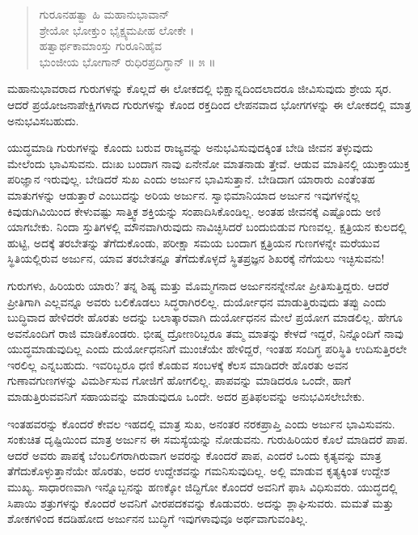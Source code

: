 \begin{verse}
ಗುರೂನಹತ್ವಾ ಹಿ ಮಹಾನುಭಾವಾನ್​\\ಶ್ರೇಯೋ ಭೋಕ್ತುಂ ಭೈಕ್ಷ್ಯಮಪೀಹ ಲೋಕೇ ।\\ಹತ್ವಾರ್ಥಕಾಮಾಂಸ್ತು ಗುರೂನಿಹೈವ\\ಭುಂಜೀಯ ಭೋಗಾನ್ ರುಧಿರಪ್ರದಿಗ್ಧಾನ್ \num{॥ ೫ ॥}
\end{verse}

{\small ಮಹಾನುಭಾವರಾದ ಗುರುಗಳನ್ನು ಕೊಲ್ಲದೆ ಈ ಲೋಕದಲ್ಲಿ ಭಿಕ್ಷಾನ್ನದಿಂದಲಾದರೂ ಜೀವಿಸುವುದು ಶ್ರೇಯ ಸ್ಕರ. ಆದರೆ ಪ್ರಯೋಜನಾಪೇಕ್ಷಿಗಳಾದ ಗುರುಗಳನ್ನು ಕೊಂದ ರಕ್ತದಿಂದ ಲೇಪನವಾದ ಭೋಗಗಳನ್ನು ಈ ಲೋಕದಲ್ಲಿ ಮಾತ್ರ ಅನುಭವಿಸಬಹುದು.}

ಯುದ್ಧಮಾಡಿ ಗುರುಗಳನ್ನು ಕೊಂದು ಬರುವ ರಾಜ್ಯವನ್ನು ಅನುಭವಿಸುವುದಕ್ಕಿಂತ ಬೇಡಿ ಜೀವನ ತಳ್ಳುವುದು ಮೇಲೆಂದು ಭಾವಿಸುವನು. ದುಃಖ ಬಂದಾಗ ನಾವು ಏನೇನೋ ಮಾತನಾಡು ತ್ತೇವೆ. ಆಡುವ ಮಾತಿನಲ್ಲಿ ಯುಕ್ತಾಯುಕ್ತ ಪರಿಜ್ಞಾನ ಇರುವುಲ್ಲ. ಬೇಡಿದರೆ ಸುಖ ಎಂದು ಅರ್ಜುನ ಭಾವಿಸುತ್ತಾನೆ. ಬೇಡಿದಾಗ ಯಾರಾರು ಎಂತೆಂತಹ ಮಾತುಗಳನ್ನು ಆಡುತ್ತಾರೆ ಎಂಬುದನ್ನು ಅರಿಯ ಅರ್ಜುನ. ಸ್ವಾಭಿಮಾನಿಯಾದ ಅರ್ಜುನ ಇವುಗಳನ್ನೆಲ್ಲ ಕಿವುಡುಗಿವಿಯಿಂದ ಕೇಳುವಷ್ಟು ಸಾತ್ತ್ವಿಕ ಶಕ್ತಿಯನ್ನು ಸಂಪಾದಿಸಿಕೊಂಡಿಲ್ಲ. ಅಂತಹ ಜೀವನಕ್ಕೆ ಎಷ್ಟೊಂದು ಅಣಿ ಯಾಗಬೇಕು. ನಿಂದಾ ಸ್ತುತಿಗಳಲ್ಲಿ ಮೌನವಾಗಿರುವುದು ನಾವಿಚ್ಛಿಸಿದರೆ ಬಂದುಬಿಡುವ ಗುಣವಲ್ಲ. ಕ್ಷತ್ರಿಯನ ಕುಲದಲ್ಲಿ ಹುಟ್ಟಿ, ಅದಕ್ಕೆ ತರಬೇತನ್ನು ತೆಗೆದುಕೊಂಡು, ಪರೀಕ್ಷಾ ಸಮಯ ಬಂದಾಗ ಕ್ಷತ್ರಿಯನ ಗುಣಗಳನ್ನೇ ಮರೆಯುವ ಸ್ಥಿತಿಯಲ್ಲಿರುವ ಅರ್ಜುನ, ಯಾವ ತರಬೇತನ್ನೂ ತೆಗೆದುಕೊಳ್ಳದೆ ಸ್ಥಿತಪ್ರಜ್ಞನ ಶಿಖರಕ್ಕೆ ನೆಗೆಯಲು ಇಚ್ಛಿಸುವನು!

ಗುರುಗಳು, ಹಿರಿಯರು ಯಾರು? ತನ್ನ ಶಿಷ್ಯ ಮತ್ತು ಮೊಮ್ಮಗನಾದ ಅರ್ಜುನನನ್ನೇನೋ ಪ್ರೀತಿಸುತ್ತಿದ್ದರು. ಆದರೆ ಪ್ರೀತಿಗಾಗಿ ಎಲ್ಲವನ್ನೂ ಅವರು ಬಲಿಕೊಡಲು ಸಿದ್ಧರಾಗಿರಲಿಲ್ಲ. ದುರ್ಯೋಧನ ಮಾಡುತ್ತಿರುವುದು ತಪ್ಪು ಎಂದು ಬುದ್ಧಿವಾದ ಹೇಳಿದರೇ ಹೊರತು ಅದನ್ನು ಬಲಾತ್ಕಾರವಾಗಿ ದುರ್ಯೋಧನನ ಮೇಲೆ ಪ್ರಯೋಗ ಮಾಡಲಿಲ್ಲ. ಹೇಗೂ ಅವನೊಂದಿಗೆ ರಾಜಿ ಮಾಡಿಕೊಂಡರು. ಭೀಷ್ಮ ದ್ರೋಣರಿಬ್ಬರೂ ತಮ್ಮ ಮಾತನ್ನು ಕೇಳದೆ ಇದ್ದರೆ, ನಿನ್ನೊಂದಿಗೆ ನಾವು ಯುದ್ಧಮಾಡುವುದಿಲ್ಲ ಎಂದು ದುರ್ಯೋಧನನಿಗೆ ಮುಂಚೆಯೇ ಹೇಳಿದ್ದರೆ, ಇಂತಹ ಸಂದಿಗ್ಧ ಪರಿಸ್ಥಿತಿ ಉದಿಸುತ್ತಿರಲೇ ಇರಲಿಲ್ಲ ಎನ್ನಬಹುದು. ಇವರಿಬ್ಬರೂ ಧಣಿ ಕೊಡುವ ಸಂಬಳಕ್ಕೆ ಕೆಲಸ ಮಾಡಿದರೇ ಹೊರತು ಅವನ ಗುಣಾವಗುಣಗಳನ್ನು ವಿಮರ್ಶಿಸುವ ಗೋಜಿಗೆ ಹೋಗಲಿಲ್ಲ. ಪಾಪವನ್ನು ಮಾಡಿದರೂ ಒಂದೇ, ಹಾಗೆ ಮಾಡುತ್ತಿರುವವನಿಗೆ ಸಹಾಯವನ್ನು ಮಾಡುವುದೂ ಒಂದೇ. ಅದರ ಪ್ರತಿಫಲವನ್ನು ಅನುಭವಿಸಲೇಬೇಕು.

ಇಂತಹವರನ್ನು ಕೊಂದರೆ ಕೇವಲ ಇಹದಲ್ಲಿ ಮಾತ್ರ ಸುಖ, ಅನಂತರ ನರಕಪ್ರಾಪ್ತಿ ಎಂದು ಅರ್ಜುನ ಭಾವಿಸುವನು. ಸಂಕುಚಿತ ದೃಷ್ಟಿಯಿಂದ ಮಾತ್ರ ಅರ್ಜುನ ಈ ಸಮಸ್ಯೆಯನ್ನು ನೋಡುವನು. ಗುರುಹಿರಿಯರ ಕೊಲೆ ಮಾಡಿದರೆ ಪಾಪ. ಆದರೆ ಅವರು ಪಾಪಕ್ಕೆ ಬೆಂಬಲಿಗರಾಗಿರುವಾಗ ಅವರನ್ನು ಕೊಂದರೆ ಪಾಪ, ಎಂದರೆ ಒಂದು ಕೃತ್ಯವನ್ನು ಮಾತ್ರ ತೆಗೆದುಕೊಳ್ಳುತ್ತಾನೆಯೇ ಹೊರತು, ಅದರ ಉದ್ದೇಶವನ್ನು ಗಮನಿಸುವುದಿಲ್ಲ. ಅಲ್ಲಿ ಮಾಡುವ ಕೃತ್ಯಕ್ಕಿಂತ ಉದ್ದೇಶ ಮುಖ್ಯ. ಸಾಧಾರಣವಾಗಿ ಇನ್ನೊಬ್ಬನನ್ನು ಹಣಕ್ಕೋ ಜಿದ್ದಿಗೋ ಕೊಂದರೆ ಅವನಿಗೆ ಫಾಸಿ ವಿಧಿಸುವರು. ಯುದ್ಧದಲ್ಲಿ ಸಿಪಾಯಿ ಶತ್ರುಗಳನ್ನು ಕೊಂದರೆ ಅವನಿಗೆ ವೀರಪದಕವನ್ನು ಕೊಡುವರು. ಅದನ್ನು ಶ್ಲಾಘಿಸುವರು. ಮಮತೆ ಮತ್ತು ಶೋಕಗಳಿಂದ ಕದಡಿಹೋದ ಅರ್ಜುನನ ಬುದ್ಧಿಗೆ ಇವುಗಳಾವುವೂ ಅರ್ಥವಾಗುವಂತಿಲ್ಲ.

